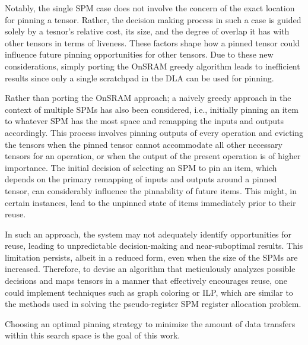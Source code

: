 Notably, the single SPM case does not involve the concern of the exact location for
pinning a tensor. Rather, the decision making process in such a case is guided
solely by a tesnor's relative cost, its size, and the degree of overlap it has
with other tensors in terms of liveness. These factors shape how a pinned
tensor could influence future pinning opportunities for other tensors.
Due to these new considerations, simply porting the OnSRAM greedy algorithm 
leads to inefficient results since only a single scratchpad in the DLA can
be used for pinning.

Rather than porting the OnSRAM approach; a naively greedy approach in the
context of multiple SPMs has also been considered, i.e., initially pinning an
item to whatever SPM has the most space and remapping the inputs and outputs
accordingly. This process involves pinning outputs of every operation and
evicting the tensors when the pinned tensor cannot accommodate all other
necessary tensors for an operation, or when the output of the present operation
is of higher importance. The initial decision of selecting an SPM to pin an
item, which depends on the primary remapping of inputs and outputs around a
pinned tensor, can considerably influence the pinnability of future items. This
might, in certain instances, lead to the unpinned state of items immediately
prior to their reuse.

In such an approach, the system may not adequately identify opportunities for
reuse, leading to unpredictable decision-making and near-suboptimal results.
This limitation persists, albeit in a reduced form, even when the size of the
SPMs are increased. Therefore, to devise an algorithm that meticulously analyzes
possible decisions and maps tensors in a manner that effectively encourages
reuse, one could implement techniques such as graph coloring or ILP, which are
similar to the methods used in solving the pseudo-register SPM register
allocation problem.

Choosing an optimal pinning strategy to minimize the amount of data transfers
within this search space is the goal of this work.


